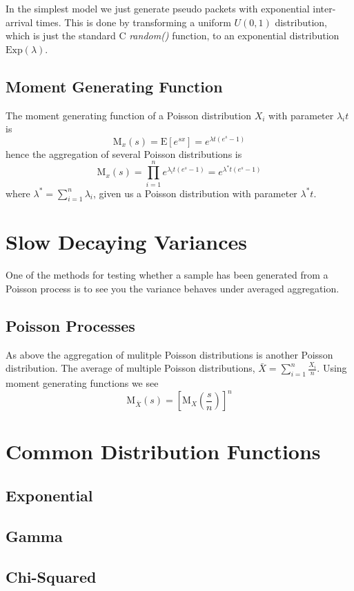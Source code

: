 In the simplest model we just generate pseudo packets with exponential
inter-arrival times.  This is done by transforming a uniform $U(0,1)$
distribution, which is just the standard C {\em random()} function, to
an exponential distribution $\mbox{Exp}(\lambda)$.

\subsection{Moment Generating Function}

The moment generating function of a Poisson distribution $X_i$ with
parameter $\lambda_i t$ is
\[
\mbox{M}_x(s) = \mbox{E}[e^{sx}] = e^{\lambda t(e^s - 1)}
\]
hence the aggregation of several Poisson distributions is
\[ \mbox{M}_x(s) = \prod_{i=1}^n{e^{\lambda_i t(e^s-1)}} =
e^{\lambda^* t(e^s-1)} \]
where $\lambda^* = \sum_{i=1}^n{\lambda_i}$, given us a Poisson
distribution with parameter $\lambda^*t$.

\section{Slow Decaying Variances}

One of the methods for testing whether a sample has been generated
from a Poisson process is to see you the variance behaves under
averaged aggregation.

\subsection{Poisson Processes}

As above the aggregation of mulitple Poisson distributions is another
Poisson distribution.  The average of multiple Poisson distributions,
$\bar X = \sum_{i=1}^{n}{\frac{X_i}{n}}$.  Using moment generating
functions we see
\[ \mbox{M}_{\bar X}(s) = \left[\mbox{M}_X(\frac{s}{n})\right]^n\]

\section{Common Distribution Functions}

\subsection{Exponential}
\subsection{Gamma}
\subsection{Chi-Squared}
